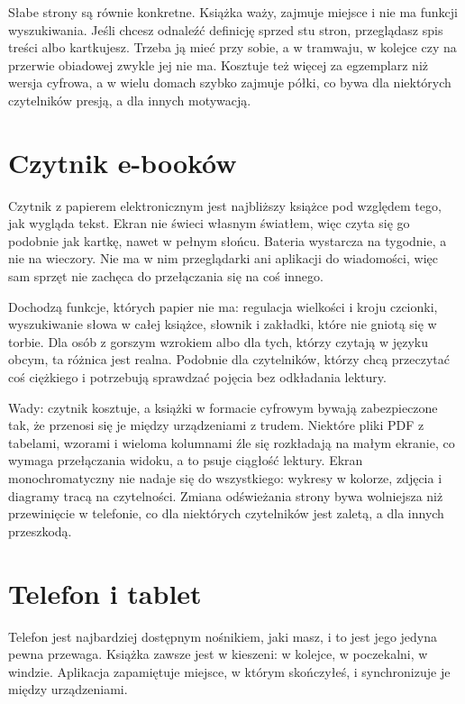 Słabe strony są równie konkretne. Książka waży, zajmuje miejsce i nie ma funkcji wyszukiwania. Jeśli chcesz odnaleźć definicję sprzed stu stron, przeglądasz spis treści albo kartkujesz. Trzeba ją mieć przy sobie, a w tramwaju, w kolejce czy na przerwie obiadowej zwykle jej nie ma. Kosztuje też więcej za egzemplarz niż wersja cyfrowa, a w wielu domach szybko zajmuje półki, co bywa dla niektórych czytelników presją, a dla innych motywacją.

\section{Czytnik e-booków}

Czytnik z papierem elektronicznym jest najbliższy książce pod względem tego, jak wygląda tekst. Ekran nie świeci własnym światłem, więc czyta się go podobnie jak kartkę, nawet w pełnym słońcu. Bateria wystarcza na tygodnie, a nie na wieczory. Nie ma w nim przeglądarki ani aplikacji do wiadomości, więc sam sprzęt nie zachęca do przełączania się na coś innego.

Dochodzą funkcje, których papier nie ma: regulacja wielkości i kroju czcionki, wyszukiwanie słowa w całej książce, słownik i zakładki, które nie gniotą się w torbie. Dla osób z gorszym wzrokiem albo dla tych, którzy czytają w języku obcym, ta różnica jest realna. Podobnie dla czytelników, którzy chcą przeczytać coś ciężkiego i potrzebują sprawdzać pojęcia bez odkładania lektury.

Wady: czytnik kosztuje, a książki w formacie cyfrowym bywają zabezpieczone tak, że przenosi się je między urządzeniami z trudem. Niektóre pliki PDF z tabelami, wzorami i wieloma kolumnami źle się rozkładają na małym ekranie, co wymaga przełączania widoku, a to psuje ciągłość lektury. Ekran monochromatyczny nie nadaje się do wszystkiego: wykresy w kolorze, zdjęcia i diagramy tracą na czytelności. Zmiana odświeżania strony bywa wolniejsza niż przewinięcie w telefonie, co dla niektórych czytelników jest zaletą, a dla innych przeszkodą.

\section{Telefon i tablet}

Telefon jest najbardziej dostępnym nośnikiem, jaki masz, i to jest jego jedyna pewna przewaga. Książka zawsze jest w kieszeni: w kolejce, w poczekalni, w windzie. Aplikacja zapamiętuje miejsce, w którym skończyłeś, i synchronizuje je między urządzeniami.

